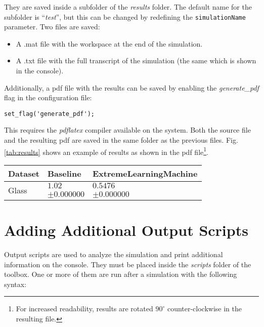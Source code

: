 \noindent They are saved inside a subfolder of the \textit{results} folder. The default name for the subfolder is ``\textit{test}'', but this can be changed by redefining the \verb|simulationName| parameter. Two files are saved:

\begin{itemize}
\item A .mat file with the workspace at the end of the simulation.
\item A .txt file with the full transcript of the simulation (the same which is shown in the console).
\end{itemize}

Additionally, a pdf file with the results can be saved by enabling the \textit{generate\_pdf} flag in the configuration file:

\begin{lstlisting}
set_flag('generate_pdf');
\end{lstlisting}

\noindent This requires the \textit{pdflatex} compiler available on the system. Both the source file and the resulting pdf are saved in the same folder as the previous files. Fig. \ref{tab:results} shows an example of results as shown in the pdf file\footnote{For increased readability, results are rotated $90^\circ$ counter-clockwise in the resulting file.}.

\begin{table*}[ht]
{\footnotesize\centering\hfill{}
\begin{tabular}{lll}
\toprule
Dataset & Baseline & ExtremeLearningMachine\\ 
\midrule
\multirow{2}{*}{Glass} & $1.02$ & $0.5476$\\ 
 & $\pm 0.000000$ & $\pm 0.000000$\\ 
\bottomrule
\end{tabular}}
\hfill{}\vspace{0.6em}
\caption{Experimental results (Error).}
\label{tab:results}
\end{table*}

\section{Adding Additional Output Scripts}
\label{sec:outputscripts}

Output scripts are used to analyze the simulation and print additional information on the console. They must be placed inside the \textit{scripts} folder of the toolbox. One or more of them are run after a simulation with the following syntax:

